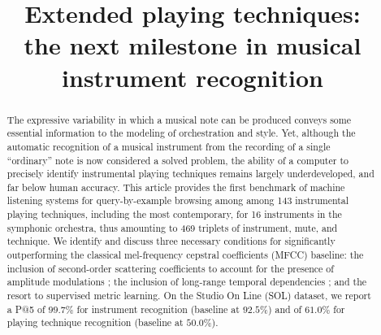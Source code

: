 \documentclass{article}
\title{Extended playing techniques: \\
the next milestone in musical instrument recognition}
\begin{document}
%
\maketitle

\begin{abstract}
The expressive variability in which a musical note can be produced conveys some
essential information to the modeling of orchestration and style. Yet, although
the automatic recognition of a musical instrument from the recording of a
single ``ordinary'' note is now considered a solved problem, the ability of a
computer to precisely identify instrumental playing techniques remains largely
underdeveloped, and far below human accuracy. This article provides the first
benchmark of machine listening systems for query-by-example browsing among
among 143 instrumental playing techniques, including the most contemporary, for
16 instruments in the symphonic orchestra, thus amounting to 469 triplets of
instrument, mute, and technique. We identify and discuss three necessary
conditions for significantly outperforming the classical mel-frequency cepstral
coefficients (MFCC) baseline: the inclusion of second-order scattering
coefficients to account for the presence of amplitude modulations ; the
inclusion of long-range temporal dependencies ; and the resort to supervised
metric learning. On the Studio On Line (SOL) dataset, we report a P@5 of $99.7\%$
for instrument recognition (baseline at $92.5\%$) and of $61.0\%$ for playing
technique recognition (baseline at $50.0\%$).
\end{abstract}

\end{document}
